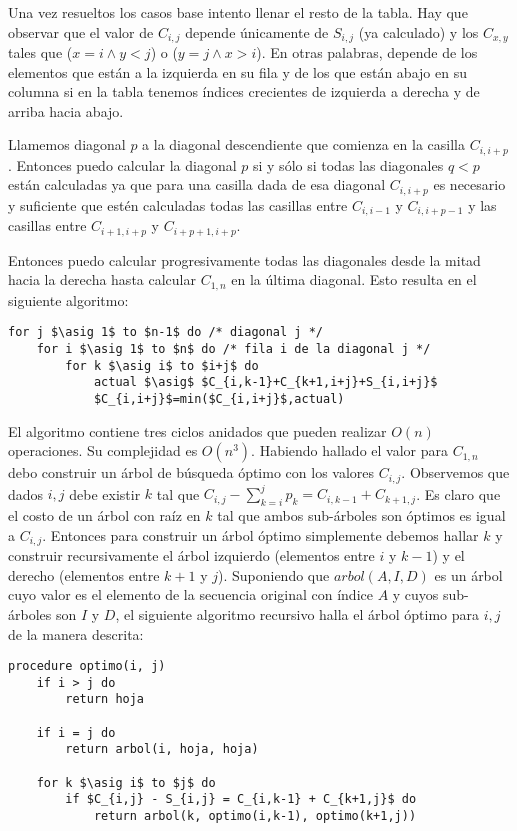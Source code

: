 \documentclass{article}
\newcommand{\asig}{\ensuremath{\leftarrow}}
\begin{document}
Una vez resueltos los
casos base intento llenar el resto de la tabla. Hay que observar que el valor de $C_{i,j}$
depende únicamente de $S_{i,j}$ (ya calculado) y los $C_{x,y}$ tales que ($x=i \wedge y<j$) o
($y=j \wedge x>i$). En otras palabras, depende de los elementos que están a la izquierda en su
fila y de los que están abajo en su columna si en la tabla tenemos índices crecientes de izquierda
a derecha y de arriba hacia abajo.

Llamemos diagonal $p$ a la diagonal descendiente que comienza en la casilla $C_{i,i+p}$. Entonces
puedo calcular la diagonal $p$ si y sólo si todas las diagonales $q < p$ están calculadas
ya que para una casilla
dada de esa diagonal $C_{i,i+p}$ es necesario y suficiente que estén calculadas todas las casillas
entre $C_{i,i-1}$ y $C_{i,i+p-1}$ y las casillas entre $C_{i+1,i+p}$ y $C_{i+p+1,i+p}$.

Entonces puedo calcular progresivamente todas las diagonales desde la mitad
hacia la derecha hasta calcular $C_{1,n}$ en la última diagonal. Esto resulta en
el siguiente algoritmo:

\begin{lstlisting}[caption={Cálculo de la tabla C},label=alg:completoC]
for j $\asig 1$ to $n-1$ do /* diagonal j */
    for i $\asig 1$ to $n$ do /* fila i de la diagonal j */
        for k $\asig i$ to $i+j$ do
            actual $\asig$ $C_{i,k-1}+C_{k+1,i+j}+S_{i,i+j}$
            $C_{i,i+j}$=min($C_{i,i+j}$,actual)
\end{lstlisting}

El algoritmo contiene tres ciclos anidados que pueden realizar $O(n)$ operaciones. Su
complejidad es $O(n^3)$. Habiendo hallado el valor para $C_{1,n}$ debo construir un árbol
de búsqueda óptimo con los valores $C_{i,j}$. Observemos que dados $i, j$
debe existir $k$ tal que $C_{i,j} - \sum_{k=i}^j p_k = C_{i,k-1} + C_{k+1,j}$.
Es claro que el costo de un árbol con raíz en $k$ tal que ambos sub-árboles son óptimos es
igual a $C_{i,j}$. Entonces para construir un árbol óptimo simplemente debemos hallar $k$
y construir recursivamente el árbol izquierdo (elementos entre $i$ y $k-1$) y el derecho
(elementos entre $k+1$ y $j$). Suponiendo que $arbol(A,I,D)$ es un árbol cuyo valor es el elemento
de la secuencia original con índice $A$ y cuyos
sub-árboles son $I$ y $D$, el siguiente algoritmo recursivo halla el árbol óptimo para
$i,j$ de la manera descrita:

\begin{lstlisting}[caption={Cálculo del árbol},label=alg:arbol]
procedure optimo(i, j)
    if i > j do
        return hoja

    if i = j do
        return arbol(i, hoja, hoja)

    for k $\asig i$ to $j$ do
        if $C_{i,j} - S_{i,j} = C_{i,k-1} + C_{k+1,j}$ do
            return arbol(k, optimo(i,k-1), optimo(k+1,j))
\end{lstlisting}
\end{document}
